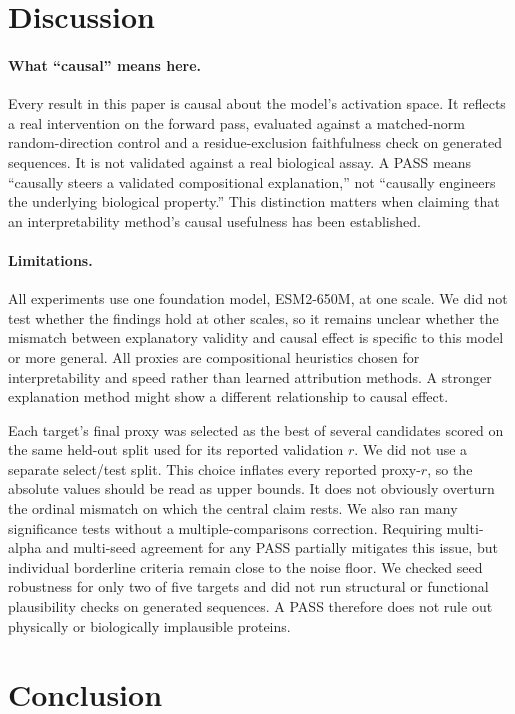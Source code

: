 \documentclass{article}
\begin{document}
\section{Discussion}

\paragraph{What ``causal'' means here.} Every result in this paper is
causal about the model's activation space. It reflects a real
intervention on the forward pass, evaluated against a matched-norm
random-direction control and a residue-exclusion faithfulness check on
generated sequences. It is not validated against a real biological
assay. A PASS means ``causally steers a validated compositional
explanation,'' not ``causally engineers the underlying biological
property.'' This distinction matters when claiming that an
interpretability method's causal usefulness has been established.

\paragraph{Limitations.} All experiments use one foundation model,
ESM2-650M, at one scale. We did not test whether the findings hold at
other scales, so it remains unclear whether the mismatch between
explanatory validity and causal effect is specific to this model or more
general. All proxies are compositional heuristics chosen for
interpretability and speed rather than learned attribution methods. A
stronger explanation method might show a different relationship to
causal effect.

Each target's final proxy was selected as the best of several candidates
scored on the same held-out split used for its reported validation $r$.
We did not use a separate select/test split. This choice inflates every
reported proxy-$r$, so the absolute values should be read as upper bounds.
It does not obviously overturn the ordinal mismatch on which the central
claim rests. We also ran many significance tests without a
multiple-comparisons correction. Requiring multi-alpha and multi-seed
agreement for any PASS partially mitigates this issue, but individual
borderline criteria remain close to the noise floor. We checked seed
robustness for only two of five targets and did not run structural or
functional plausibility checks on generated sequences. A PASS therefore
does not rule out physically or biologically implausible proteins.

\section{Conclusion}
\end{document}
